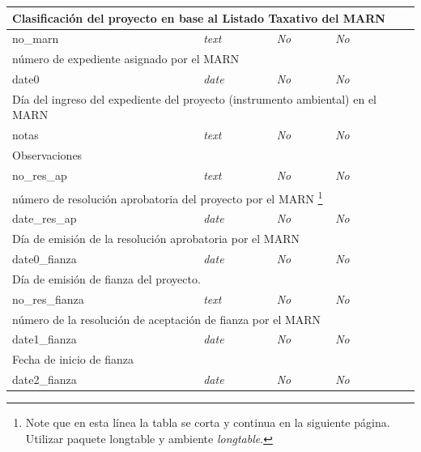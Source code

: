 \begin{longtable}{|l|l|l|l|l|}
	\multicolumn{ 5}{|l|}{Clasificación del proyecto en base al Listado Taxativo del MARN} \\ \hline
		no\_marn & \textit{text} & \textit{No} & \textit{No} & \textit{} \\ \hline

	\multicolumn{ 5}{|l|}{número de expediente asignado por el MARN} \\ \hline
		date0 & \textit{date} & \textit{No} & \textit{No} & \textit{} \\ \hline

	\multicolumn{ 5}{|l|}{Día del ingreso del expediente del proyecto (instrumento ambiental) en el MARN} \\ \hline
		notas & \textit{text} & \textit{No} & \textit{No} & \textit{} \\ \hline

	\multicolumn{ 5}{|l|}{Observaciones} \\ \hline
		no\_res\_ap & \textit{text} & \textit{No} & \textit{No} & \textit{} \\ \hline

	\multicolumn{ 5}{|l|}{número de resolución aprobatoria del proyecto por el MARN%
	\footnote{Note que en esta línea la tabla se corta y continua en la siguiente página. 
	Utilizar paquete \textsf{longtable} y ambiente \textit{longtable}.}} \\ \hline
		date\_res\_ap & \textit{date} & \textit{No} & \textit{No} & \textit{} \\ \hline

	\multicolumn{ 5}{|l|}{Día de emisión de la resolución aprobatoria por el MARN} \\ \hline
		date0\_fianza & \textit{date} & \textit{No} & \textit{No} & \textit{} \\ \hline

	\multicolumn{ 5}{|l|}{Día de emisión de fianza del proyecto.} \\ \hline
		no\_res\_fianza & \textit{text} & \textit{No} & \textit{No} & \textit{} \\ \hline

	\multicolumn{ 5}{|l|}{número de la resolución de aceptación de fianza por el MARN} \\ \hline
		date1\_fianza & \textit{date} & \textit{No} & \textit{No} & \textit{} \\ \hline

	\multicolumn{ 5}{|l|}{Fecha de inicio de fianza} \\ \hline
		date2\_fianza & \textit{date} & \textit{No} & \textit{No} & \textit{} \\ \hline


\end{longtable}
